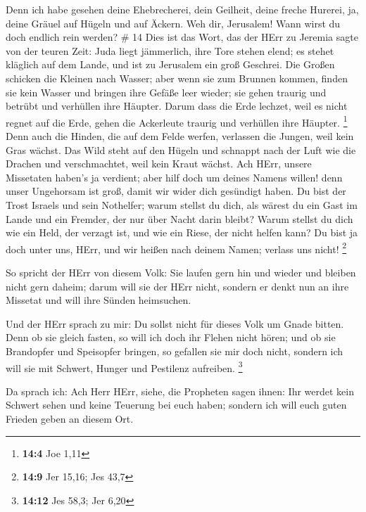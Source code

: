 Denn ich habe gesehen deine Ehebrecherei, dein Geilheit, deine freche
Hurerei, ja, deine Gräuel auf Hügeln und auf Äckern. Weh dir, Jerusalem!
Wann wirst du doch endlich rein werden? \# 14  Dies ist das
Wort, das der HErr zu Jeremia sagte von der teuren Zeit: 
Juda liegt jämmerlich, ihre Tore stehen elend; es stehet kläglich auf
dem Lande, und ist zu Jerusalem ein groß Geschrei.  Die
Großen schicken die Kleinen nach Wasser; aber wenn sie zum Brunnen
kommen, finden sie kein Wasser und bringen ihre Gefäße leer wieder; sie
gehen traurig und betrübt und verhüllen ihre Häupter.  Darum
dass die Erde lechzet, weil es nicht regnet auf die Erde, gehen die
Ackerleute traurig und verhüllen ihre Häupter. \footnote{\textbf{14:4}
  Joe 1,11}  Denn auch die Hinden, die auf dem Felde werfen,
verlassen die Jungen, weil kein Gras wächst.  Das Wild steht
auf den Hügeln und schnappt nach der Luft wie die Drachen und
verschmachtet, weil kein Kraut wächst.  Ach HErr, unsere
Missetaten haben's ja verdient; aber hilf doch um deines Namens willen!
denn unser Ungehorsam ist groß, damit wir wider dich gesündigt haben.
 Du bist der Trost Israels und sein Nothelfer; warum stellst
du dich, als wärest du ein Gast im Lande und ein Fremder, der nur über
Nacht darin bleibt?  Warum stellst du dich wie ein Held, der
verzagt ist, und wie ein Riese, der nicht helfen kann? Du bist ja doch
unter uns, HErr, und wir heißen nach deinem Namen; verlass uns nicht!
\footnote{\textbf{14:9} Jer 15,16; Jes 43,7}

 So spricht der HErr von diesem Volk: Sie laufen gern hin
und wieder und bleiben nicht gern daheim; darum will sie der HErr nicht,
sondern er denkt nun an ihre Missetat und will ihre Sünden heimsuchen.

 Und der HErr sprach zu mir: Du sollst nicht für dieses
Volk um Gnade bitten.  Denn ob sie gleich fasten, so will
ich doch ihr Flehen nicht hören; und ob sie Brandopfer und Speisopfer
bringen, so gefallen sie mir doch nicht, sondern ich will sie mit
Schwert, Hunger und Pestilenz aufreiben. \footnote{\textbf{14:12} Jes
  58,3; Jer 6,20}

 Da sprach ich: Ach Herr HErr, siehe, die Propheten sagen
ihnen: Ihr werdet kein Schwert sehen und keine Teuerung bei euch haben;
sondern ich will euch guten Frieden geben an diesem Ort.

